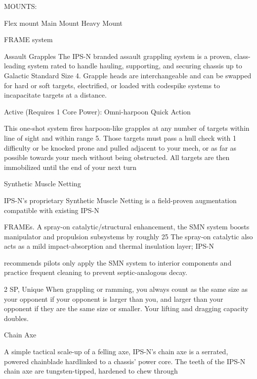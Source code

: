                                                      MOUNTS: 

  Flex mount                          Main Mount                             Heavy Mount 

                                                  FRAME system 

                                                                                                                


                                                   Assault Grapples  
   The IPS-N branded assault grappling system is a proven, class-leading system rated to handle hauling,  
  supporting, and securing chassis up to Galactic Standard Size 4. Grapple heads are interchangeable  
  and can be swapped for hard or soft targets, electrified, or loaded with codespike systems to  
  incapacitate targets at a distance. 
 

  Active (Requires 1 Core Power): Omni-harpoon  
   Quick Action
 
  This one-shot system fires harpoon-like grapples at any number of targets within line of sight and within  
   range 5. Those targets must pass a hull check with 1 difficulty or be knocked prone and pulled adjacent  
  to your mech, or as far as possible towards your mech without being obstructed. All targets are then  
   immobilized until the end of your next turn 

Synthetic Muscle Netting  

IPS-N’s proprietary Synthetic Muscle Netting is a field-proven augmentation compatible with existing IPS-N  

FRAMEs. A spray-on catalytic/structural enhancement, the SMN system boosts manipulator and  
propulsion subsystems by roughly 25%
The spray-on catalytic also acts as a mild impact-absorption and thermal insulation layer; IPS-N  

recommends pilots only apply the SMN system to interior components and practice frequent cleaning to  
prevent septic-analogous decay.    

2 SP, Unique  
When grappling or ramming, you always count as the same size as your opponent if your  
opponent is larger than you, and larger than your opponent if they are the same size or smaller.  
Your lifting and dragging capacity doubles.
 

Chain Axe  

A simple tactical scale-up of a felling axe, IPS-N’s chain axe is a serrated, powered chainblade hardlinked  
to a chassis’ power core. The teeth of the IPS-N chain axe are tungsten-tipped, hardened to chew through  

